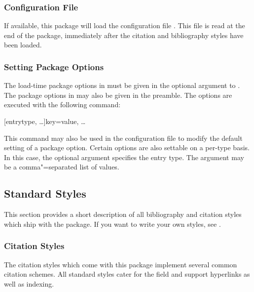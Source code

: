 \documentclass{ltxdockit}[2011/03/25]
\begin{document}
\subsubsection{Configuration File}
\label{use:cfg:cfg}

If available, this package will load the configuration file . This file is read at the end of the package, immediately after the citation and bibliography styles have been loaded.

\subsubsection{Setting Package Options}
\label{use:cfg:opt}

The load-time package options in  must be given in the optional argument to . The package options in  may also be given in the preamble. The options are executed with the following command:

\begin{ltxsyntax}

[entrytype, \dots]{key=value, \dots}

This command may also be used in the configuration file to modify the default setting of a package option. Certain options are also settable on a per-type basis. In this case, the optional  argument specifies the entry type. The  argument may be a comma"=separated list of values.

\end{ltxsyntax}

\subsection{Standard Styles}
\label{use:xbx}

This section provides a short description of all bibliography and citation styles which ship with the  package. If you want to write your own styles, see .

\subsubsection{Citation Styles}
\label{use:xbx:cbx}

The citation styles which come with this package implement several common citation schemes. All standard styles cater for the  field and support hyperlinks as well as indexing.
\end{document}
